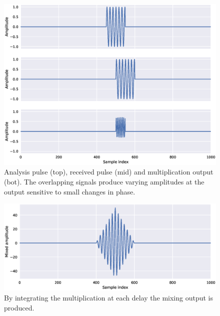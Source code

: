 \begin{figure}[h]
	\centering
	\includegraphics[scale=0.5]{figs_temp/mixing1}
	\caption{Analysis pulse (top), received pulse (mid) and multiplication output (bot). The overlapping signals produce varying amplitudes at the output sensitive to small changes in phase.}
	\label{fig:mix1}
\end{figure}

\begin{figure}[h]
	\centering
	\includegraphics[scale=0.5]{figs_temp/mixing2}
	\caption{By integrating the multiplication at each delay the mixing output is produced.}
	\label{fig:mix2}
\end{figure}

